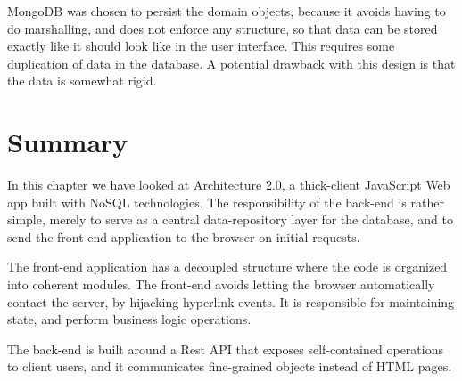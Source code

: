 MongoDB was chosen to persist the domain objects, because it avoids having to do marshalling, and does not enforce any structure, so that data can be stored exactly like it should look like in the user interface.  This requires some duplication of data in the database. A potential drawback with this design is that the data is somewhat rigid.

 \section{Summary}
In this chapter we have looked at Architecture 2.0, a thick-client JavaScript Web app built with NoSQL technologies. The responsibility of the back-end is rather simple, merely to serve as a central data-repository layer for the database, and to send the front-end application to the browser on initial requests.
 
The front-end application has a decoupled structure where the code is organized into coherent modules. The front-end avoids letting the browser automatically contact the server, by hijacking hyperlink events. It is responsible for maintaining state, and perform business logic operations.
 
The back-end is built around a Rest API that exposes self-contained operations to client users, and it communicates fine-grained objects instead of HTML pages. 

